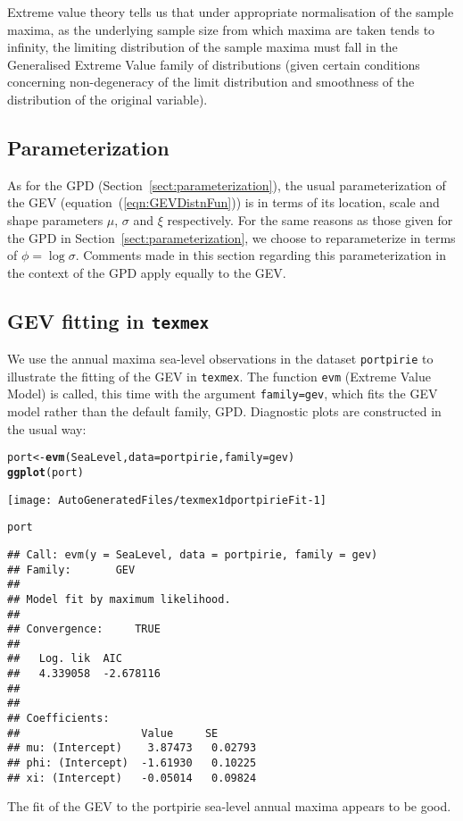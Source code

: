 \documentclass[10pt]{article}\usepackage[]{graphicx}\usepackage[]{color}
\makeatletter
\def\maxwidth{ %
  \ifdim\Gin@nat@width>\linewidth
    \linewidth
  \else
    \Gin@nat@width
  \fi
}
\newcommand{\hlstd}[1]{\textcolor[rgb]{0.345,0.345,0.345}{#1}}%
\newcommand{\hlkwb}[1]{\textcolor[rgb]{0.69,0.353,0.396}{#1}}%
\newcommand{\hlkwc}[1]{\textcolor[rgb]{0.333,0.667,0.333}{#1}}%
\newcommand{\hlkwd}[1]{\textcolor[rgb]{0.737,0.353,0.396}{\textbf{#1}}}%
\newenvironment{kframe}{%
 \def\at@end@of@kframe{}%
 \ifinner\ifhmode%
  \def\at@end@of@kframe{\end{minipage}}%
  \begin{minipage}{\columnwidth}%
 \fi\fi%
 \def\FrameCommand##1{\hskip\@totalleftmargin \hskip-\fboxsep
 \colorbox{shadecolor}{##1}\hskip-\fboxsep
     \hskip-\linewidth \hskip-\@totalleftmargin \hskip\columnwidth}%
 \MakeFramed {\advance\hsize-\width
   \@totalleftmargin\z@ \linewidth\hsize
   \@setminipage}}%
 {\par\unskip\endMakeFramed%
 \at@end@of@kframe}
\newenvironment{knitrout}{}{} %
\makeatother
\begin{document}
Extreme value theory tells us that under appropriate normalisation of
the sample maxima, as the underlying sample size from which maxima are taken tends to infinity, the limiting distribution of the sample maxima must fall in the Generalised Extreme Value family of distributions
(given certain conditions concerning non-degeneracy of the limit
distribution and smoothness of the distribution of the original
variable).
%
\subsection{Parameterization}
%
As for the GPD (Section~\ref{sect:parameterization}), the usual parameterization of the GEV (equation~(\ref{eqn:GEVDistnFun})) is in terms of its
location, scale and shape parameters $\mu$, $\sigma$ and $\xi$ respectively. For the same reasons as those given for the GPD in Section~\ref{sect:parameterization}, we choose to  reparameterize in terms of $\phi = \log\sigma$.  Comments made in this section regarding this parameterization in the context of the GPD apply equally to the GEV.
%
\subsection{GEV fitting in {\tt texmex}}
%
We use the annual maxima sea-level observations in the dataset {\tt portpirie} to illustrate the fitting of the GEV in {\tt texmex}.  The function {\tt evm} (Extreme Value Model) is called, this time with the argument {\tt family=gev}, which fits the GEV model rather than the default family, GPD.  Diagnostic plots are constructed in the usual way:
\begin{knitrout}
\color{fgcolor}\begin{kframe}
\begin{alltt}
\hlstd{port} \hlkwb{<-} \hlkwd{evm}\hlstd{(SeaLevel,}\hlkwc{data}\hlstd{=portpirie,}\hlkwc{family}\hlstd{=gev)}
\hlkwd{ggplot}\hlstd{(port)}
\end{alltt}
\end{kframe}
\texttt{[image: AutoGeneratedFiles/texmex1dportpirieFit-1]} 
\begin{kframe}\begin{alltt}
\hlstd{port}
\end{alltt}
\begin{verbatim}
## Call: evm(y = SeaLevel, data = portpirie, family = gev)
## Family:       GEV 
## 
## Model fit by maximum likelihood.
## 
## Convergence:		TRUE
## 
##   Log. lik  AIC      
##   4.339058  -2.678116
## 
## 
## Coefficients:
##                   Value     SE      
## mu: (Intercept)    3.87473   0.02793
## phi: (Intercept)  -1.61930   0.10225
## xi: (Intercept)   -0.05014   0.09824
\end{verbatim}
\end{kframe}
\end{knitrout}
The fit of the GEV to the portpirie sea-level annual maxima appears to be good.
\end{document}
